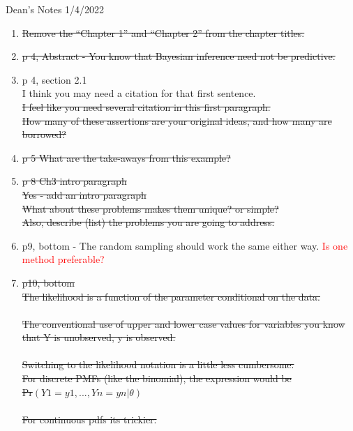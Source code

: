 \documentclass[12pt, a4paper]{article}
\begin{document}
{\huge Dean's Notes 1/4/2022}
\begin{enumerate}
  \item \sout{Remove the ``Chapter 1” and “Chapter 2” from the chapter titles.}
  \item \sout{p 4, Abstract - You know that Bayesian inference need not be predictive.}
  \item p 4, section 2.1 \\
    I think you may need a citation for that first  sentence.\\
    \sout{I feel like you need several citation in this first paragraph.}\\
    \sout{How many of these assertions are your original ideas, and how many are borrowed?}\\

  \item \sout{p 5  What are the take-aways from this example?}
  \item \sout{p 8 Ch3  intro paragraph}\\
    \sout{Yes - add an intro paragraph}\\
    \sout{What about these problems makes them unique? or simple?}\\
    \sout{Also, describe (list) the problems you are going to address.}\\
  \item p9, bottom - The random sampling should work the same either way.  \textcolor{red}{Is one method preferable?}
  \item \sout{p10, bottom} \\
    \sout{The likelihood is a function of the parameter conditional on the data.}\\\\

    \sout{The conventional use of upper and lower case values for variables you know that Y is unobserved, y is observed.}\\\\

    \sout{Switching to the likelihood notation is a little less cumbersome.}  \\
    \sout{For discrete PMFs (like the binomial), the expression would be}\\
    \sout{Pr$(Y1 = y1,...,Yn=yn | \theta)$}\\\\

    \sout{For continuous pdfs its trickier.}\\\\


\end{enumerate}
\end{document}
